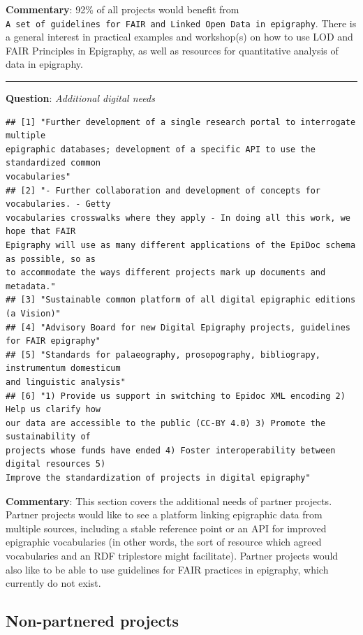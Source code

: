 \documentclass[
  10pt,
]{article}
\begin{document}
\textbf{Commentary}: 92\% of all projects would benefit from
\texttt{A\ set\ of\ guidelines\ for\ FAIR\ and\ Linked\ Open\ Data\ in\ epigraphy}.
There is a general interest in practical examples and workshop(s) on how
to use LOD and FAIR Principles in Epigraphy, as well as resources for
quantitative analysis of data in epigraphy.

\begin{center}\rule{0.5\linewidth}{0.5pt}\end{center}

\textbf{Question}: \emph{Additional digital needs}

\begin{verbatim}
## [1] "Further development of a single research portal to interrogate multiple
epigraphic databases; development of a specific API to use the standardized common
vocabularies"
## [2] "- Further collaboration and development of concepts for vocabularies. - Getty
vocabularies crosswalks where they apply - In doing all this work, we hope that FAIR
Epigraphy will use as many different applications of the EpiDoc schema as possible, so as
to accommodate the ways different projects mark up documents and metadata."
## [3] "Sustainable common platform of all digital epigraphic editions (a Vision)"
## [4] "Advisory Board for new Digital Epigraphy projects, guidelines for FAIR epigraphy"
## [5] "Standards for palaeography, prosopography, bibliograpy, instrumentum domesticum
and linguistic analysis"
## [6] "1) Provide us support in switching to Epidoc XML encoding 2) Help us clarify how
our data are accessible to the public (CC-BY 4.0) 3) Promote the sustainability of
projects whose funds have ended 4) Foster interoperability between digital resources 5)
Improve the standardization of projects in digital epigraphy"
\end{verbatim}

\textbf{Commentary}: This section covers the additional needs of partner
projects. Partner projects would like to see a platform linking
epigraphic data from multiple sources, including a stable reference
point or an API for improved epigraphic vocabularies (in other words,
the sort of resource which agreed vocabularies and an RDF triplestore
might facilitate). Partner projects would also like to be able to use
guidelines for FAIR practices in epigraphy, which currently do not
exist.

\hypertarget{non-partnered-projects}{%
\subsection{Non-partnered projects}\label{non-partnered-projects}}
\end{document}
